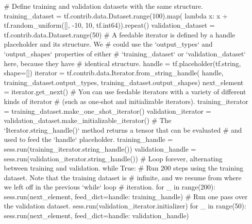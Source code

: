 \begin{python}
# Define training and validation datasets with the same structure.
training_dataset = tf.contrib.data.Dataset.range(100).map(
    lambda x: x + tf.random_uniform([], -10, 10, tf.int64)).repeat()
validation_dataset = tf.contrib.data.Dataset.range(50)
# A feedable iterator is defined by a handle placeholder and its structure. We
# could use the `output\_types` and `output\_shapes` properties of either
# `training\_dataset` or `validation\_dataset` here, because they have
# identical structure.
handle = tf.placeholder(tf.string, shape=[])
iterator = tf.contrib.data.Iterator.from_string_handle(
        handle, training_dataset.output_types, training_dataset.output_shapes)
next_element = iterator.get_next()
# You can use feedable iterators with a variety of different kinds of iterator
# (such as one-shot and initializable iterators).
training_iterator = training_dataset.make_one_shot_iterator()
validation_iterator = validation_dataset.make_initializable_iterator()
# The `Iterator.string\_handle()` method returns a tensor that can be evaluated
# and used to feed the `handle` placeholder.
training_handle = sess.run(training_iterator.string_handle())
validation_handle = sess.run(validation_iterator.string_handle())
# Loop forever, alternating between training and validation.
while True:
# Run 200 steps using the training dataset. Note that the training dataset is
# infinite, and we resume from where we left off in the previous `while` loop
# iteration.
    for _ in range(200):
        sess.run(next_element, feed_dict={handle: training_handle})
    # Run one pass over the validation dataset.
    sess.run(validation_iterator.initializer)
    for _ in range(50):
        sess.run(next_element, feed_dict={handle: validation_handle})
\end{python}
